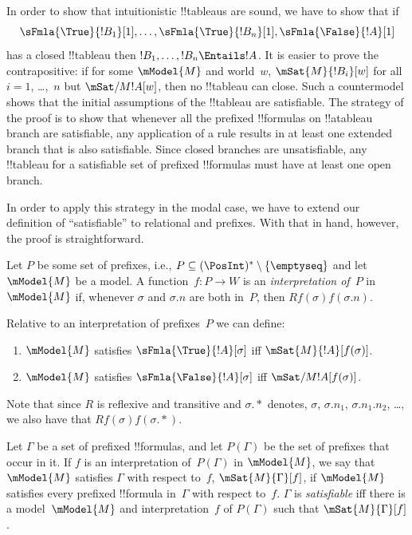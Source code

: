 \documentclass[../../../include/open-logic-section]{subfiles}
\begin{document}


\begin{explain}
  In order to show that intuitionistic !!{tableau}s are sound, we have to
  show that if
  \[
  \sFmla{\True}{!B_1}[1], \dots, \sFmla{\True}{!B_n}[1], \sFmla{\False}{!A}[1]
  \]
  has a closed !!{tableau} then $!B_1, \dots, !B_n \Entails !A$. It is
  easier to prove the contrapositive: if for some $\mModel{M}$ and
  world~$w$, $\mSat{M}{!B_i}[w]$ for all $i=1$, \dots,~$n$ but
  $\mSat/{M}{!A}[w]$, then no !!{tableau} can close. Such a
  countermodel shows that the initial assumptions of the !!{tableau}
  are satisfiable. The strategy of the proof is to show that whenever
  all the prefixed !!{formula}s on !!a{tableau} branch are
  satisfiable, any application of a rule results in at least one
  extended branch that is also satisfiable. Since closed branches are
  unsatisfiable, any !!{tableau} for a satisfiable set of prefixed
  !!{formula}s must have at least one open branch.

  In order to apply this strategy in the modal case, we have to extend
  our definition of ``satisfiable'' to relational and prefixes. With
  that in hand, however, the proof is straightforward.
\end{explain}

\begin{defn}
  Let $P$ be some set of prefixes, i.e., $P \subseteq (\PosInt)^*
  \setminus \{\emptyseq\}$ and let $\mModel{M}$ be a model.  A
  function~$f\colon P \to W$ is an \emph{interpretation of}~$P$
  in~$\mModel{M}$ if, whenever $\sigma$ and $\sigma.n$ are both
  in~$P$, then $Rf(\sigma)f(\sigma.n)$.

  Relative to an interpretation of prefixes~$P$ we can define:
  \begin{enumerate}
  \item $\mModel{M}$ satisfies $\sFmla{\True}{!A}[\sigma]$ iff
    $\mSat{M}{!A}[f(\sigma)]$.
  \item $\mModel{M}$ satisfies $\sFmla{\False}{!A}[\sigma]$ iff
    $\mSat/{M}{!A}[f(\sigma)]$.
  \end{enumerate}
\end{defn}

Note that since $R$ is reflexive and transitive and $\sigma.{*}$
denotes, $\sigma$, $\sigma.n_1$, $\sigma.n_1.n_2$, \dots, we also have
that $Rf(\sigma)f(\sigma.{*})$. 

\begin{defn}
  Let $\Gamma$ be a set of prefixed !!{formula}s, and let $P(\Gamma)$
  be the set of prefixes that occur in it. If $f$ is an interpretation
  of~$P(\Gamma)$ in $\mModel{M}$, we say that $\mModel{M}$ satisfies
  $\Gamma$ with respect to~$f$, $\mSat{M}{\Gamma}[f]$, if $\mModel{M}$
  satisfies every prefixed !!{formula} in~$\Gamma$ with respect
  to~$f$. $\Gamma$ is \emph{satisfiable} iff there is a
  model~$\mModel{M}$ and interpretation~$f$ of $P(\Gamma)$ such that
  $\mSat{M}{\Gamma}[f]$.
\end{defn}
\end{document}
